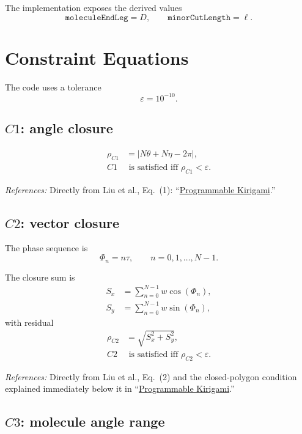 \documentclass[11pt]{article}
\newcommand{\formularefs}[1]{%
\par\smallskip
\noindent\footnotesize\textit{References: }#1
\par\smallskip\normalsize
}
\begin{document}
The implementation exposes the derived values
\[
\texttt{moleculeEndLeg} = D,
\qquad
\texttt{minorCutLength} = \ell.
\]

\section{Constraint Equations}

The code uses a tolerance
\[
\varepsilon = 10^{-10}.
\]

\subsection{$C1$: angle closure}

\begin{align}
\rho_{C1} &= \left|N\theta + N\eta - 2\pi\right|, \\
C1 &\text{ is satisfied iff } \rho_{C1} < \varepsilon.
\end{align}

\formularefs{Directly from Liu et al., Eq.~(1): ``\href{https://static1.squarespace.com/static/5783b6f903596e5098f3fce8/t/5dd2e95aee053940522eab1a/1574103423054/DETC2019-97557.pdf}{Programmable Kirigami}.''}

\subsection{$C2$: vector closure}

The phase sequence is
\[
\Phi_n = n\tau,
\qquad n=0,1,\dots,N-1.
\]

The closure sum is
\begin{align}
S_x &= \sum_{n=0}^{N-1} w\cos(\Phi_n), \\
S_y &= \sum_{n=0}^{N-1} w\sin(\Phi_n),
\end{align}
with residual
\begin{align}
\rho_{C2} &= \sqrt{S_x^2 + S_y^2}, \\
C2 &\text{ is satisfied iff } \rho_{C2} < \varepsilon.
\end{align}

\formularefs{Directly from Liu et al., Eq.~(2) and the closed-polygon condition explained immediately below it in ``\href{https://static1.squarespace.com/static/5783b6f903596e5098f3fce8/t/5dd2e95aee053940522eab1a/1574103423054/DETC2019-97557.pdf}{Programmable Kirigami}.''}

\subsection{$C3$: molecule angle range}
\end{document}
